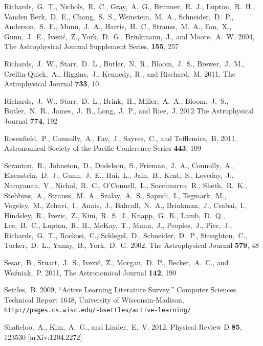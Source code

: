 \documentclass[prd, nofootinbib, floatfix, 12pt,tightenlines]{revtex4}
\begin{document}
\begin{thebibliography}{99}
Richards,~G.~T., Nichols,~R.~C., Gray,~A.~G., Brunner,~R.~J., Lupton,~R.~H.,
Vanden Berk,~D.~E., Chong,~S.~S., Weinstein,~M.~A., Schneider,~D.~P.,
Anderson,~S.~F., Munn,~J.~A., Harris,~H.~C., Strauss,~M.~A., Fan,~X.,
Gunn,~J.~E., Ivezi\'c,~Z., York,~D.~G., Brinkmann,~J., and Moore,~A.~W. 2004,
The Astrophysical Journal Supplement Series, {\bf 155}, 257

Richards,~J.~W., Starr,~D.~L., Butler,~N.~R., Bloom,~J.~S., Brewer,~J.~M.,
Crellin-Quick,~A., Higgins,~J., Kennedy,~R., and Rischard,~M. 2011,
The Astrophysical Journal {\bf 733}, 10

Richards,~J.~W., Starr,~D.~L., Brink,~H., Miller,~A.~A., Bloom,~J.~S.,
Butler,~N.~R., James,~J.~B., Long,~J.~P., and Rice,~J. 2012
The Astrophysical Journal {\bf 774}, 192

Rosenfield,~P., Connolly,~A., Fay,~J., Sayres,~C., and Tofflemire,~B. 2011,
Astronomical Society of the Pacific Conference Series {\bf 443}, 109

Scranton,~R., Johnston,~D., Dodelson,~S., Frieman,~J.~A., Connolly,~A.,
Eisenstein,~D.~J., Gunn,~J.~E., Hui,~L., Jain,~B., Kent,~S., Loveday,~J.,
Narayanan,~V., Nichol,~R.~C., O'Connell,~L., Soccimarro,~R., Sheth,~R.~K.,
Stebbins,~A., Strauss,~M.~A., Szalay,~A.~S., Sapudi,~I., Tegmark,~M.,
Vogeley,~M., Zehavi,~I., Annis,~J., Bahcall,~N.~A., Brinkman,~J., Csabai,~I.,
Hindsley,~R., Ivezic,~Z., Kim,~R.~S.~J., Knapp,~G.~R., Lamb,~D.~Q., Lee,~B.~C.,
Lupton,~R.~H., McKay,~T., Munn,~J., Peoples,~J., Pier,~J., Richards,~G.~T.,
Rockosi,~C., Schlegel,~D., Schneider,~D.~P., Stoughton,~C., Tucker,~D.~L.,
Yanny,~B., York,~D.~G. 2002, The Astrophysical Journal {\bf 579}, 48

Sesar,~B., Stuart,~J.~S., Ivezi\'c,~\u Z., Morgan,~D.~P., Becker,~A.~C., and
Wo\'zniak,~P. 2011, The Astronomical Journal {\bf 142}, 190

Settles,~B. 2009, ``Active Learning Literature Survey,'' Computer Sciences Technical
Report 1648, University of Wisconsin-Madison,
\verb|http://pages.cs.wisc.edu/~bsettles/active-learning/|


Shafieloo,~A., Kim,~A.~G., and Linder,~E.~V. 2012,
Physical Review D {\bf 85}, 123530 [arXiv:1204.2272]



\end{thebibliography}
\end{document}
